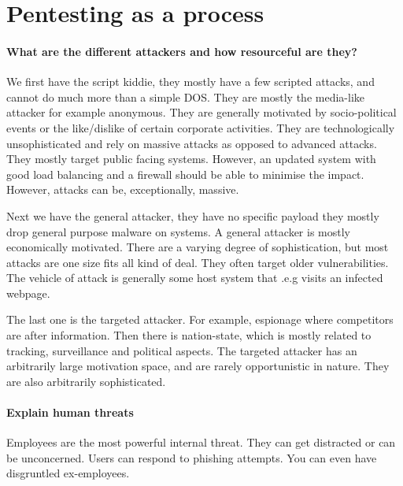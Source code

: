 \section{Pentesting as a process}
\paragraph{What are the different attackers and how resourceful are they?}
We first have the script kiddie, they mostly have a few scripted attacks, and cannot do much more than a simple DOS. They are mostly the media-like attacker for example anonymous. They are generally motivated by socio-political events or the like/dislike of certain corporate activities. They are technologically unsophisticated and rely on massive attacks as opposed to advanced attacks. They mostly target public facing systems. However, an updated system with good load balancing and a firewall should be able to minimise the impact. However, attacks can be, exceptionally, massive.

Next we have the general attacker, they have no specific payload they mostly drop general purpose malware on systems. A general attacker is mostly economically motivated. There are a varying degree of sophistication, but most attacks are one size fits all kind of deal. They often target older vulnerabilities. The vehicle of attack is generally some host system that .e.g visits an infected webpage.

The last one is the targeted attacker. For example, espionage where competitors are after information. Then there is nation-state, which is mostly related to tracking, surveillance and political aspects. The targeted attacker has an arbitrarily large motivation space, and are rarely opportunistic in nature. They are also arbitrarily sophisticated.

\paragraph{Explain human threats}
Employees are the most powerful internal threat. They can get distracted or can be unconcerned. Users can respond to phishing attempts. You can even have disgruntled ex-employees.